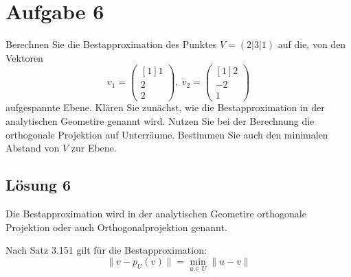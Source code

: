 \documentclass[main.tex]{subfiles}
\begin{document}
\section{Aufgabe 6}
Berechnen Sie die Bestapproximation des Punktes $V=( 2|3|1)$ auf die, von den Vektoren
\begin{equation*}
    v_{1} =\begin{pmatrix}[1]
    1\\
    2\\
    2
    \end{pmatrix} ,\ v_{2} =\begin{pmatrix}[1]
    2\\
    -2\\
    1
    \end{pmatrix}
\end{equation*}
aufgespannte Ebene. Klären Sie zunächst, wie die Bestapproximation in der analytischen Geometire genannt wird. Nutzen Sie bei der Berechnung die orthogonale Projektion auf Unterräume. Bestimmen Sie auch den minimalen Abstand von $V$ zur Ebene.

\subsection{Lösung 6}
Die Bestapproximation wird in der analytischen Geometire orthogonale Projektion oder auch Orthogonalprojektion genannt.

Nach Satz 3.151 gilt für die Bestapproximation:
\begin{equation*}
\| v-p_{U}( v) \| =\underset{u\in U}{\min} \| u-v\|
\end{equation*}
\end{document}
